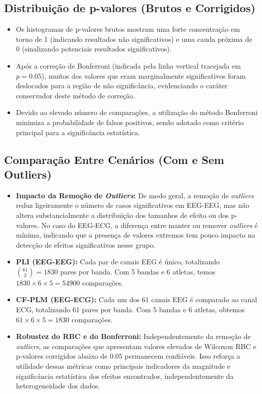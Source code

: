 \subsection{Distribuição de p-valores (Brutos e Corrigidos)}
\begin{itemize}
    \item Os histogramas de p-valores brutos mostram uma forte concentração em torno de 1 (indicando resultados não significativos) e uma cauda próxima de 0 (sinalizando potenciais resultados significativos).
    \item Após a correção de Bonferroni (indicada pela linha vertical tracejada em \(p=0.05\)), muitos dos valores que eram marginalmente significativos foram deslocados para a região de não significância, evidenciando o caráter conservador deste método de correção.
    \item Devido ao elevado número de comparações, a utilização do método Bonferroni minimiza a probabilidade de falsos positivos, sendo adotado como critério principal para a significância estatística.
\end{itemize}

\subsection{Comparação Entre Cenários (Com e Sem Outliers)}
\begin{itemize}
    \item \textbf{Impacto da Remoção de \textit{Outliers}:} De modo geral, a remoção de \textit{outliers} reduz ligeiramente o número de casos significativos em EEG-EEG, mas não altera substancialmente a distribuição dos tamanhos de efeito ou dos p-valores. No caso do EEG-ECG, a diferença entre manter ou remover \textit{outliers} é mínima, indicando que a presença de valores extremos tem pouco impacto na detecção de efeitos significativos nesse grupo.
    \item \textbf{PLI (EEG-EEG):} Cada par de canais EEG é único, totalizando \(\binom{61}{2}=1830\) pares por banda. Com 5 bandas e 6 atletas, temos \(1830\times6\times5=54900\) comparações.
    \item \textbf{CF-PLM (EEG-ECG):} Cada um dos 61 canais EEG é comparado ao canal ECG, totalizando \(61\) pares por banda. Com 5 bandas e 6 atletas, obtemos \(61\times6\times5=1830\) comparações.
    \item \textbf{Robustez do RBC e do Bonferroni:} Independentemente da remoção de \textit{outliers}, as comparações que apresentam valores elevados de Wilcoxon RBC e p-valores corrigidos abaixo de \( 0.05 \) permanecem confiáveis. Isso reforça a utilidade dessas métricas como principais indicadores da magnitude e significância estatística dos efeitos encontrados, independentemente da heterogeneidade dos dados.
\end{itemize}

